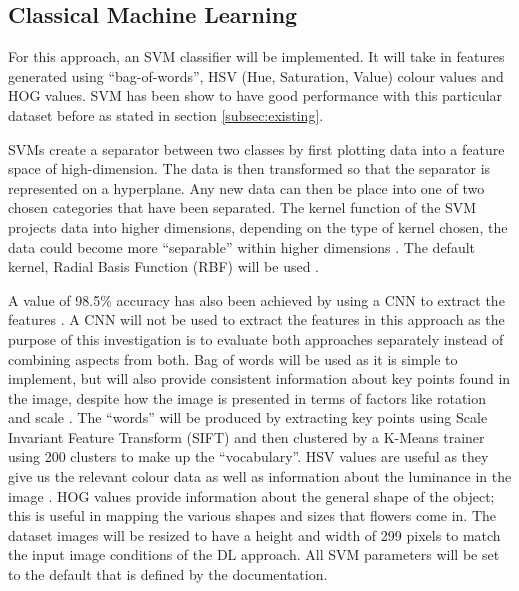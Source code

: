 \documentclass[12pt,a4paper]{report}
\begin{document}
\subsection{Classical Machine Learning}

For this approach, an SVM classifier will be implemented. It will take in features generated using 
“bag-of-words”, HSV (Hue, Saturation, Value) colour values and HOG values. SVM has been show to have 
good performance with this particular dataset before as 
stated in section \ref{subsec:existing}.

\par

SVMs create a separator between two classes by first plotting data into a feature space of high-dimension. The data is 
then transformed so that the separator is represented on a hyperplane. Any new data can then be place into one of two 
chosen categories that have been separated. The kernel function of the SVM projects data into higher dimensions, 
depending on the type of kernel chosen, the data could become more “separable” within higher dimensions 
\citep{NobleWilliamS2006Wias}. The default kernel, Radial Basis Function (RBF) will be used \citep{sckikitsvm}. 

\par

A value of 98.5\% accuracy has also been achieved by using a CNN to extract the features 
\citep{mete}. A CNN will not be used to extract the features in this approach as the purpose of this investigation is to 
evaluate both 
approaches separately instead of combining aspects from both. Bag of words will be used as it is simple to implement, 
but will also provide consistent information about key points found in the image, despite how the image is presented in 
terms of factors like rotation and scale \citep{mohan}.
The “words” will be produced by extracting key points using Scale Invariant Feature
Transform (SIFT) and then clustered by a K-Means trainer using 200 clusters to make up the “vocabulary”. HSV values are 
useful as they give
us the relevant colour data as well as information about the 
luminance in the image \citep{chapelle1999support}. HOG values provide information about the general
shape of the object; this is useful in mapping the various shapes and sizes that flowers come in. The dataset images 
will be resized to have a height and width of 
299 pixels to match the input image conditions of the DL approach. All SVM parameters will be set to the 
default that is defined by the documentation.
\end{document}
